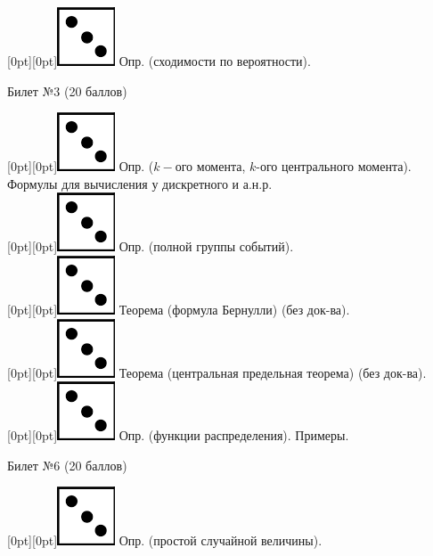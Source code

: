 \documentclass[10pt]{article}
\begin{document}
\raisebox{-1pt}[0pt][0pt]{\includegraphics[width=0.02\linewidth]{3.png}} Опр. (сходимости по вероятности). \\

\begin{center} {\Large Билет №3 (20 баллов)} \end{center}

\raisebox{-1pt}[0pt][0pt]{\includegraphics[width=0.02\linewidth]{3.png}} Опр. ($k-$ого момента, $k$-ого центрального момента). Формулы для вычисления у дискретного и а.н.р. \\

\raisebox{-1pt}[0pt][0pt]{\includegraphics[width=0.02\linewidth]{3.png}} Опр. (полной группы событий). \\

\raisebox{-1pt}[0pt][0pt]{\includegraphics[width=0.02\linewidth]{3.png}} Теорема (формула Бернулли) (без док-ва). \\

\raisebox{-1pt}[0pt][0pt]{\includegraphics[width=0.02\linewidth]{3.png}} Теорема (центральная предельная теорема) (без док-ва). \\

\raisebox{-1pt}[0pt][0pt]{\includegraphics[width=0.02\linewidth]{3.png}} Опр. (функции распределения). Примеры. \\

\begin{center} {\Large Билет №6 (20 баллов)} \end{center}

\raisebox{-1pt}[0pt][0pt]{\includegraphics[width=0.02\linewidth]{3.png}} Опр. (простой случайной величины). \\
\end{document}
